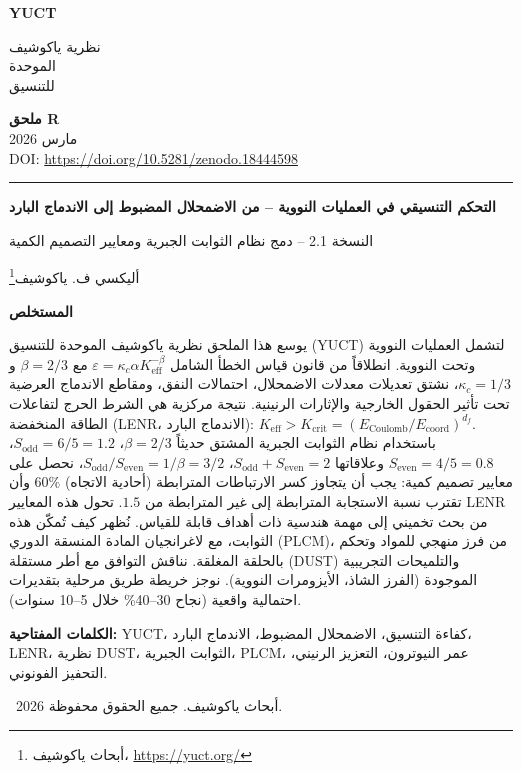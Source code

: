 \documentclass[11pt,a4paper]{article}
\newcommand{\Keff}{K_{\mathrm{eff}}}
\newcommand{\df}{d_{\!f}}
\newcommand{\Kcrit}{K_{\mathrm{crit}}}
\newcommand{\Sodd}{S_{\mathrm{odd}}}
\newcommand{\Seven}{S_{\mathrm{even}}}
\theoremstyle{remark}
\newcommand{\makeheader}{%
	\noindent
	\begin{minipage}{0.17\textwidth}
		\raggedright
		{\sffamily\bfseries\color{skyblue}\fontsize{46}{46}\selectfont YUCT}%
	\end{minipage}%
	\hspace{30pt}
	\begin{minipage}{0.32\textwidth}
		\raggedright
		{\sffamily\fontsize{11}{13}\selectfont نظرية ياكوشيف\\ الموحدة\\ للتنسيق}%
	\end{minipage}%
	\hfill
	\begin{minipage}{0.38\textwidth}
		\raggedleft
		{\sffamily\bfseries ملحق R}\\
		{\sffamily مارس 2026}\\
		{\sffamily\footnotesize DOI: \url{https://doi.org/10.5281/zenodo.18444598}}%
	\end{minipage}
	\par\vspace{5pt}
	\noindent\textcolor{gold}{\rule{\textwidth}{1.6pt}}
	\par\vspace{0pt}
}
\begin{document}
	\thispagestyle{firstpage}
	\makeheader
	
	\vspace{0cm}
	{\LARGE\bfseries التحكم التنسيقي في العمليات النووية -- من الاضمحلال المضبوط إلى الاندماج البارد \par}
	\vspace{0.1cm}
	{\large النسخة 2.1 -- دمج نظام الثوابت الجبرية ومعايير التصميم الكمية}
	\vspace{0.2cm}
	
	{\large أليكسي ف. ياكوشيف\footnote{أبحاث ياكوشيف، \url{https://yuct.org/}}} \\
	\vspace{0.0cm}
	
	{\color{darkblue}\textbf{\LARGE المستخلص}} \par
	{\large
		\noindent
		يوسع هذا الملحق نظرية ياكوشيف الموحدة للتنسيق (YUCT) لتشمل العمليات النووية وتحت النووية. انطلاقاً من قانون قياس الخطأ الشامل \(\varepsilon = \kappa_c \alpha \Keff^{-\beta}\) مع \(\beta = 2/3\) و\(\kappa_c = 1/3\)، نشتق تعديلات معدلات الاضمحلال، احتمالات النفق، ومقاطع الاندماج العرضية تحت تأثير الحقول الخارجية والإثارات الرنينية. نتيجة مركزية هي الشرط الحرج لتفاعلات الطاقة المنخفضة (LENR، الاندماج البارد): \(\Keff > \Kcrit = (E_{\text{Coulomb}}/E_{\text{coord}})^{\df}\). باستخدام نظام الثوابت الجبرية المشتق حديثاً \(\beta = 2/3\)، \(\Sodd = 6/5 = 1.2\)، \(\Seven = 4/5 = 0.8\) وعلاقاتها \(\Sodd+\Seven=2\)، \(\Sodd/\Seven = 1/\beta = 3/2\)، نحصل على معايير تصميم كمية: يجب أن يتجاوز كسر الارتباطات المترابطة (أحادية الاتجاه) \(60\%\) وأن تقترب نسبة الاستجابة المترابطة إلى غير المترابطة من \(1.5\). تحول هذه المعايير LENR من بحث تخميني إلى مهمة هندسية ذات أهداف قابلة للقياس. نُظهر كيف تُمكّن هذه الثوابت، مع لاغرانجيان المادة المنسقة الدوري (PLCM)، من فرز منهجي للمواد وتحكم بالحلقة المغلقة. نناقش التوافق مع أطر مستقلة (DUST) والتلميحات التجريبية الموجودة (الفرز الشاذ، الأيزومرات النووية). نوجز خريطة طريق مرحلية بتقديرات احتمالية واقعية (نجاح 30–40\% خلال 5–10 سنوات).
	}
	
	\vspace{0.1cm}
	\noindent
	{\color{darkblue}\textbf{الكلمات المفتاحية:}} YUCT، كفاءة التنسيق، الاضمحلال المضبوط، الاندماج البارد، LENR، نظرية DUST، الثوابت الجبرية، PLCM، عمر النيوترون، التعزيز الرنيني، التحفيز الفونوني.
	
	\vspace{0.5cm}
	\noindent
	\textcopyright\ 2026 أبحاث ياكوشيف. جميع الحقوق محفوظة.
	
	\tableofcontents
	\newpage
	
\end{document}
